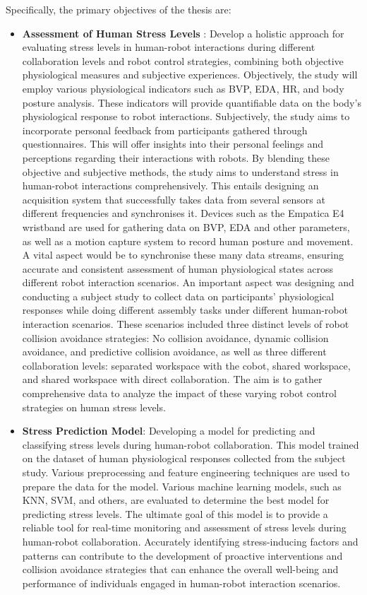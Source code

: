 Specifically, the primary objectives of the thesis are: 
\begin{itemize}
	\item \textbf{Assessment of Human Stress Levels }: Develop a holistic approach for evaluating stress levels in human-robot interactions during different collaboration levels and robot control strategies, combining both objective physiological measures and subjective experiences. Objectively, the study will employ various physiological indicators such as \gls{BVP}, \gls{EDA}, \gls{HR}, and body posture analysis. These indicators will provide quantifiable data on the body's physiological response to robot interactions. Subjectively, the study aims to incorporate personal feedback from participants gathered through questionnaires. This will offer insights into their personal feelings and perceptions regarding their interactions with robots. By blending these objective and subjective methods, the study aims to understand stress in human-robot interactions comprehensively.
    This entails designing an acquisition system that successfully takes data from several sensors at different frequencies and synchronises it. Devices such as the Empatica E4 wristband \textcite{emp} are used for gathering data on \gls{BVP}, \gls{EDA} and other parameters, as well as a motion capture system to record human posture and movement. A vital aspect would be to synchronise these many data streams, ensuring accurate and consistent assessment of human physiological states across different robot interaction scenarios. 
    An important aspect was designing and conducting a subject study to collect data on participants' physiological responses while doing different assembly tasks under different human-robot interaction scenarios. These scenarios included three distinct levels of robot collision avoidance strategies: No collision avoidance, dynamic collision avoidance, and predictive collision avoidance, as well as three different collaboration levels: separated workspace with the cobot, shared workspace, and shared workspace with direct collaboration. The aim is to gather comprehensive data to analyze the impact of these varying robot control strategies on human stress levels. 
    \item \textbf{Stress Prediction Model}: Developing a model for predicting and classifying stress levels during human-robot collaboration. This model trained on the dataset of human physiological responses collected from the subject study. Various preprocessing and feature engineering techniques are used to prepare the data for the model.
    Various machine learning models, such as \gls{KNN}, \gls{SVM}, and others, are evaluated to determine the best model for predicting stress levels. The ultimate goal of this model is to provide a reliable tool for real-time monitoring and assessment of stress levels during human-robot collaboration. Accurately identifying stress-inducing factors and patterns can contribute to the development of proactive interventions and collision avoidance strategies that can enhance the overall well-being and performance of individuals engaged in human-robot interaction scenarios.

  \end{itemize}

